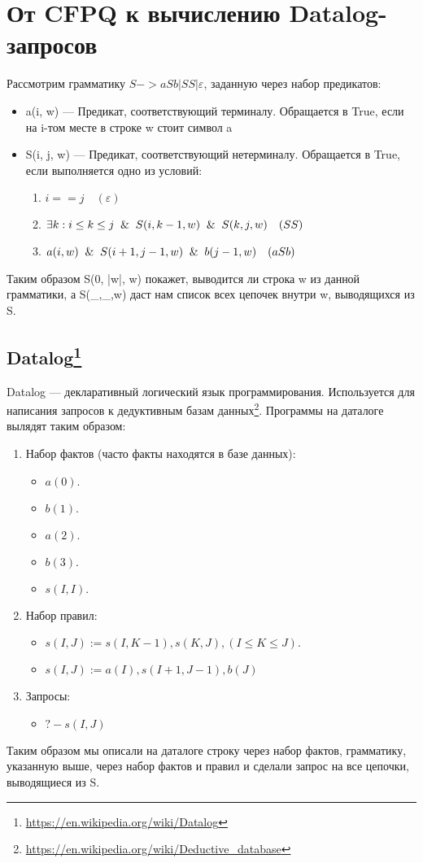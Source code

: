 \section{От CFPQ к вычислению Datalog-запросов}\label{Subsection Datalog}
Рассмотрим грамматику  $S -> aSb | SS | \varepsilon$, заданную через набор предикатов:
\begin{itemize}
	\item a(i, w) --- Предикат, соответствующий терминалу. Обращается в True, если на i-том месте в строке w стоит символ a
	\item S(i, j, w) --- Предикат, соответствующий нетерминалу. Обращается в True, если выполняется одно из условий:
	\begin{enumerate}
		\item $i == j \quad(\varepsilon)$
		\item $\exists k: i \leq k \leq j \And S(i, k - 1, w) \And S(k, j, w)  \quad (SS)$
		\item  ${a(i, w) \And S(i+1, j-1, w) \And b(j-1, w)} \quad (aSb)$
	\end{enumerate}
\end{itemize}

Таким образом S(0, |w|, w) покажет, выводится ли строка w из данной грамматики,
а S(\_,\_,w) даст нам список всех цепочек внутри w, выводящихся из S.

\subsection{Datalog\footnote{\url{https://en.wikipedia.org/wiki/Datalog}}}
Datalog --- декларативный логический язык программирования. Используется для написания запросов к дедуктивным базам данных\footnote{\url{https://en.wikipedia.org/wiki/Deductive_database}}. Программы на даталоге вылядят таким образом:
\begin{enumerate}
	\item Набор фактов (часто факты находятся в базе данных):
	\begin{itemize}
		\item $a(0).$
		\item $b(1).$
		\item $a(2).$
		\item $b(3).$
		\item $s(I, I).$
	\end{itemize}
	\item Набор правил:
	\begin{itemize}
		\item $s(I, J) := s(I, K-1), s(K,J), (I \leq K \leq J).$
		\item $s(I,J):=a(I), s(I+1, J-1),b(J)$
	\end{itemize}
	\item Запросы:
	\begin{itemize}
		\item $?- s(I, J)$
	\end{itemize}
\end{enumerate}
Таким образом мы описали на даталоге строку через набор фактов, грамматику, указанную выше, через набор фактов и правил и сделали запрос на все цепочки, выводящиеся из S. 

